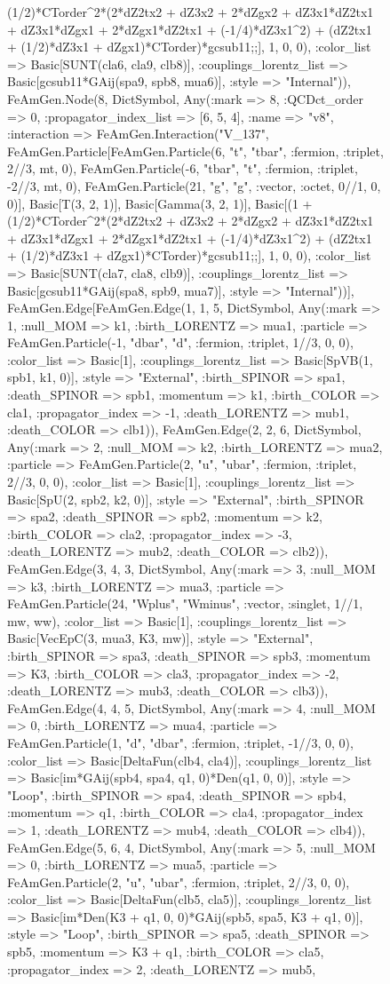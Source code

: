 \documentclass{revtex4}
\begin{document}
\begin{figure}[!htb]
\begin{center}
{(1/2)*CTorder^2*(2*dZ2tx2 + dZ3x2 + 2*dZgx2 + dZ3x1*dZ2tx1 + dZ3x1*dZgx1 + 2*dZgx1*dZ2tx1 + (-1/4)*dZ3x1^2) + (dZ2tx1 + (1/2)*dZ3x1 + dZgx1)*CTorder)*gcsub11;;], 1, 0, 0), :color_list => Basic[SUNT(cla6, cla9, clb8)], :couplings_lorentz_list => Basic[gcsub11*GAij(spa9, spb8, mua6)], :style => "Internal")), FeAmGen.Node(8, Dict{Symbol, Any}(:mark => 8, :QCDct_order => 0, :propagator_index_list => [6, 5, 4], :name => "v8", :interaction => FeAmGen.Interaction("V_137", FeAmGen.Particle[FeAmGen.Particle(6, "t", "tbar", :fermion, :triplet, 2//3, mt, 0), FeAmGen.Particle(-6, "tbar", "t", :fermion, :triplet, -2//3, mt, 0), FeAmGen.Particle(21, "g", "g", :vector, :octet, 0//1, 0, 0)], Basic[T(3, 2, 1)], Basic[Gamma(3, 2, 1)], Basic[(1 + (1/2)*CTorder^2*(2*dZ2tx2 + dZ3x2 + 2*dZgx2 + dZ3x1*dZ2tx1 + dZ3x1*dZgx1 + 2*dZgx1*dZ2tx1 + (-1/4)*dZ3x1^2) + (dZ2tx1 + (1/2)*dZ3x1 + dZgx1)*CTorder)*gcsub11;;], 1, 0, 0), :color_list => Basic[SUNT(cla7, cla8, clb9)], :couplings_lorentz_list => Basic[gcsub11*GAij(spa8, spb9, mua7)], :style => "Internal"))], FeAmGen.Edge[FeAmGen.Edge(1, 1, 5, Dict{Symbol, Any}(:mark => 1, :null_MOM => k1, :birth_LORENTZ => mua1, :particle => FeAmGen.Particle(-1, "dbar", "d", :fermion, :triplet, 1//3, 0, 0), :color_list => Basic[1], :couplings_lorentz_list => Basic[SpVB(1, spb1, k1, 0)], :style => "External", :birth_SPINOR => spa1, :death_SPINOR => spb1, :momentum => k1, :birth_COLOR => cla1, :propagator_index => -1, :death_LORENTZ => mub1, :death_COLOR => clb1)), FeAmGen.Edge(2, 2, 6, Dict{Symbol, Any}(:mark => 2, :null_MOM => k2, :birth_LORENTZ => mua2, :particle => FeAmGen.Particle(2, "u", "ubar", :fermion, :triplet, 2//3, 0, 0), :color_list => Basic[1], :couplings_lorentz_list => Basic[SpU(2, spb2, k2, 0)], :style => "External", :birth_SPINOR => spa2, :death_SPINOR => spb2, :momentum => k2, :birth_COLOR => cla2, :propagator_index => -3, :death_LORENTZ => mub2, :death_COLOR => clb2)), FeAmGen.Edge(3, 4, 3, Dict{Symbol, Any}(:mark => 3, :null_MOM => k3, :birth_LORENTZ => mua3, :particle => FeAmGen.Particle(24, "Wplus", "Wminus", :vector, :singlet, 1//1, mw, ww), :color_list => Basic[1], :couplings_lorentz_list => Basic[VecEpC(3, mua3, K3, mw)], :style => "External", :birth_SPINOR => spa3, :death_SPINOR => spb3, :momentum => K3, :birth_COLOR => cla3, :propagator_index => -2, :death_LORENTZ => mub3, :death_COLOR => clb3)), FeAmGen.Edge(4, 4, 5, Dict{Symbol, Any}(:mark => 4, :null_MOM => 0, :birth_LORENTZ => mua4, :particle => FeAmGen.Particle(1, "d", "dbar", :fermion, :triplet, -1//3, 0, 0), :color_list => Basic[DeltaFun(clb4, cla4)], :couplings_lorentz_list => Basic[im*GAij(spb4, spa4, q1, 0)*Den(q1, 0, 0)], :style => "Loop", :birth_SPINOR => spa4, :death_SPINOR => spb4, :momentum => q1, :birth_COLOR => cla4, :propagator_index => 1, :death_LORENTZ => mub4, :death_COLOR => clb4)), FeAmGen.Edge(5, 6, 4, Dict{Symbol, Any}(:mark => 5, :null_MOM => 0, :birth_LORENTZ => mua5, :particle => FeAmGen.Particle(2, "u", "ubar", :fermion, :triplet, 2//3, 0, 0), :color_list => Basic[DeltaFun(clb5, cla5)], :couplings_lorentz_list => Basic[im*Den(K3 + q1, 0, 0)*GAij(spb5, spa5, K3 + q1, 0)], :style => "Loop", :birth_SPINOR => spa5, :death_SPINOR => spb5, :momentum => K3 + q1, :birth_COLOR => cla5, :propagator_index => 2, :death_LORENTZ => mub5, }
\end{center}
\end{figure}
\end{document}
